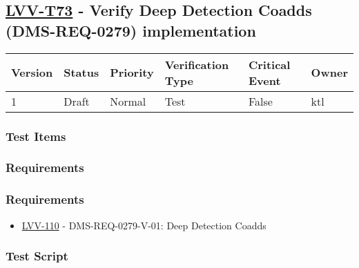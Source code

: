 \hypertarget{lvv-t73---verify-deep-detection-coadds-dms-req-0279-implementation}{%
\subsection{\texorpdfstring{\href{https://jira.lsstcorp.org/secure/Tests.jspa\#/testCase/LVV-T73}{LVV-T73}
- Verify Deep Detection Coadds (DMS-REQ-0279)
implementation}{LVV-T73 - Verify Deep Detection Coadds (DMS-REQ-0279) implementation}}\label{lvv-t73---verify-deep-detection-coadds-dms-req-0279-implementation}}

\begin{longtable}[]{@{}llllll@{}}
\toprule
Version & Status & Priority & Verification Type & Critical Event &
Owner\tabularnewline
\midrule
\endhead
1 & Draft & Normal & Test & False & ktl\tabularnewline
\bottomrule
\end{longtable}

\hypertarget{test-items-13}{%
\subsubsection{Test Items}\label{test-items-13}}

\hypertarget{requirements-26}{%
\subsubsection{Requirements}\label{requirements-26}}

\hypertarget{requirements-27}{%
\subsubsection{Requirements}\label{requirements-27}}

\begin{itemize}
\tightlist
\item
  \href{https://jira.lsstcorp.org/browse/LVV-110}{LVV-110} -
  DMS-REQ-0279-V-01: Deep Detection Coadds
\end{itemize}

\hypertarget{test-script-13}{%
\subsubsection{Test Script}\label{test-script-13}}

